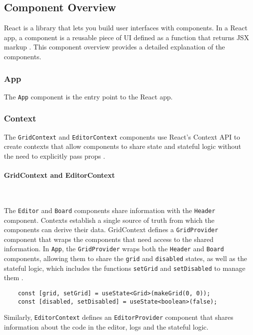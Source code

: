 \subsection{Component Overview}
React is a library that lets you build user interfaces with components. In a React app, a component is a reusable piece of UI defined as a function that returns JSX markup \cite{react-component}. This component overview provides a detailed explanation of the components.

\subsubsection{App}
The \texttt{App} component is the entry point to the React app.

\subsubsection{Context}
The \texttt{GridContext} and \texttt{EditorContext} components use React’s Context API to create contexts that allow components to share state and stateful logic without the need to explicitly pass props \cite{react-context}.

\paragraph{GridContext and EditorContext} \

The \texttt{Editor} and \texttt{Board} components share information with the \texttt{Header} component. Contexts establish a single source of truth from which the components can derive their data. GridContext defines a \texttt{GridProvider} component that wraps the components that need access to the shared information. In \texttt{App}, the \texttt{GridProvider} wraps both the \texttt{Header} and \texttt{Board} components, allowing them to share the \texttt{grid} and \texttt{disabled} states, as well as the stateful logic, which includes the functions \texttt{setGrid} and \texttt{setDisabled} to manage them \cite{react-hooks}.

\begin{verbatim}
    const [grid, setGrid] = useState<Grid>(makeGrid(0, 0));
    const [disabled, setDisabled] = useState<boolean>(false);
\end{verbatim}

Similarly, \texttt{EditorContext} defines an \texttt{EditorProvider} component that shares information about the code in the editor, logs and the stateful logic.

